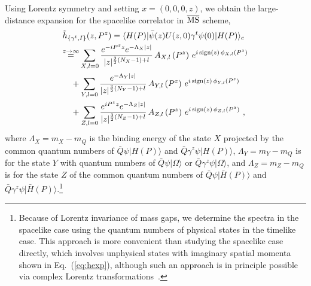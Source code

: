 \documentclass[a4paper,11pt]{article}
\begin{document}
Using Lorentz symmetry and setting $x=(0,0,0,z)$, we obtain the large-distance expansion for the spacelike correlator in $\overline{\rm MS}$ scheme,
\begin{align}\label{eq:qPDFLzGen}
&\tilde{h}_{\{\gamma^t,I\}}(z,P^z)  
=   \langle H(P) | \bar{\psi}(z) U(z,0) \gamma^t  \psi(0) | H(P) \rangle_c   \nonumber\\
&{\overset{z\rightarrow \infty}{=}}   
 \sum_{X,l=0} \frac{e^{-i P^z z} e^{-\Lambda_X |z| }}{|z|^{\frac{3}{2}(N_X-1)+l}} \, A_{X,l}\left(P^z\right) \, e^{i \, {\rm sign}(z) \, \phi_{X,l}(P^z)} \nonumber\\
&\quad + \sum_{Y,l=0} \frac{e^{-\Lambda_Y |z|}}{|z|^{\frac{3}{2}(N_Y-1)+l}} \, A_{Y,l}\left(P^z\right) \, e^{i \, {\rm sign}(z) \, \phi_{Y,l}(P^z)} \nonumber\\
&\quad + \sum_{Z,l=0} \frac{e^{i P^z z} e^{-\Lambda_Z |z|}}{|z|^{\frac{3}{2}(N_Z-1)+l}} \, A_{Z,l}\left(P^z\right) \, e^{i \, {\rm sign}(z) \, \phi_{Z,l}(P^z)} \ ,
\end{align}
where $\Lambda_X=m_X-m_Q$ is the binding energy of the state $X$ projected by the common quantum numbers of $\bar{Q} \psi | H(P) \rangle$ and $\bar{Q} \gamma^z \psi | H(P) \rangle$, $\Lambda_Y=m_Y-m_Q$ is for the state $Y$ with quantum numbers of $\bar{Q}  \psi | \Omega \rangle$ or $\bar{Q} \gamma^z \psi | \Omega \rangle$, and $\Lambda_Z=m_Z-m_Q$ is for the state $Z$ of the common quantum numbers of $\bar{Q} \psi | \bar{H}(P) \rangle$ and $\bar{Q} \gamma^z \psi | \bar{H}(P) \rangle$.\footnote{Because of Lorentz invariance of mass gaps, we determine the spectra in the spacelike case using the quantum numbers of physical states in the timelike case. This approach is more convenient than studying the spacelike case directly, which involves unphysical states with imaginary spatial momenta shown in Eq.~(\ref{eq:hexp}), although such an approach is in principle possible via complex Lorentz transformations~\cite{Streater:1989vi}.} 
\end{document}
